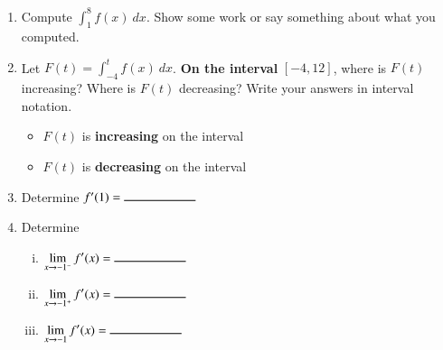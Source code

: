 \documentclass[12pt]{article}
\renewcommand{\emph}[1]{\textsf{\textbf{#1}}}
\newcommand{\blank}[1]{\rule{#1}{0.75pt}}
\let\ds\displaystyle
\newcounter{probcount}
\newcounter{subprobcount}
\newenvironment{subproblems}{%
\begin{enumerate}%
\setcounter{enumi}{\value{subprobcount}}%
\renewcommand{\theenumi}{\emph{\alph{enumi}}}}%
{\setcounter{subprobcount}{\value{enumi}}\end{enumerate}}
\newcommand{\be}{\begin{enumerate}}
\newcommand{\ee}{\end{enumerate}}
\begin{document}
\begin{subproblems}
\item Compute $\ds{\int_{1}^{8}f(x) \ dx}$. Show some work or say something about what you computed.

\vfill


\item  Let $\ds{F(t) = \int_{-4}^{t} f(x) \ dx}$. 
\emph{On the interval} $[-4, 12]$, where is $F(t)$ increasing? Where is $F(t)$ decreasing? Write your answers in interval notation.%

\smallskip

\begin{itemize}
	
\item $F(t)$ is \emph{increasing} on the interval \hrulefill %

\medskip

\item $F(t)$ is \emph{decreasing} on the interval \hrulefill%

\end{itemize}

\bigskip

\item Determine $f'(1) = \blank{2cm}$

\bigskip

\item Determine %
\be[(i)]
\item $\ds\lim_{x \to -1^{-}} f'(x) = \blank{2cm}$
\item $\ds\lim_{x \to -1^{+}} f'(x) = \blank{2cm}$
\item $\ds\lim_{x \to -1} f'(x) = \blank{2cm}$
\ee

\end{subproblems}

\newpage
\end{document}
